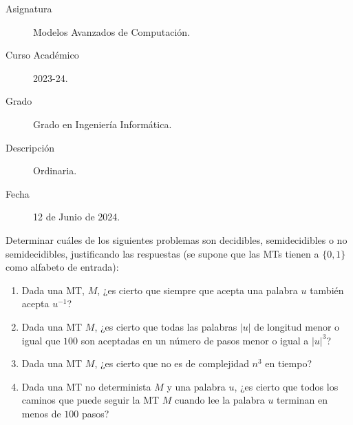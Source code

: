 \documentclass[12pt]{article}
\begin{document}

    
    

    \begin{description}
        \item[Asignatura] Modelos Avanzados de Computación.
        \item[Curso Académico] 2023-24.
        \item[Grado] Grado en Ingeniería Informática.
        \item[Descripción] Ordinaria.
        \item[Fecha] 12 de Junio de 2024.  
    \end{description}
    \newpage



    \begin{ejercicio}[2.4 puntos]
        Determinar cuáles de los siguientes problemas son decidibles, semidecidibles o no semidecidibles, justificando las respuestas (se supone que las MTs tienen a $\{0,1\}$ como alfabeto de entrada):
        \begin{enumerate}
            \item Dada una MT, $M$, ¿es cierto que siempre que acepta una palabra $u$ también acepta $u^{-1}$?
            
            \item Dada una MT $M$, ¿es cierto que todas las palabras $|u|$ de longitud menor o igual que $100$ son aceptadas en un número de pasos menor o igual a $|u|^3$?
            
            \item Dada una MT $M$, ¿es cierto que no es de complejidad $n^3$ en tiempo?
            
            \item Dada una MT no determinista $M$ y una palabra $u$, ¿es cierto que todos los caminos que puede seguir la MT $M$ cuando lee la palabra $u$ terminan en menos de $100$ pasos?
        \end{enumerate}
    \end{ejercicio}
\end{document}

